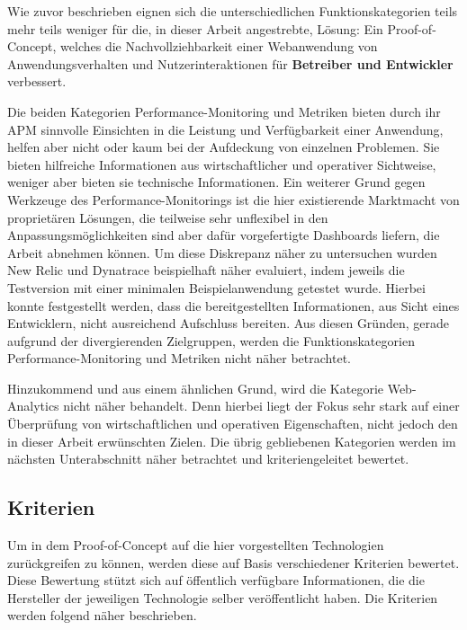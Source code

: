 Wie zuvor beschrieben eignen sich die unterschiedlichen Funktionskategorien teils mehr teils weniger für die, in dieser Arbeit angestrebte, Lösung: Ein Proof-of-Concept, welches die Nachvollziehbarkeit einer Webanwendung von Anwendungsverhalten und Nutzerinteraktionen für \textbf{Betreiber und Entwickler} verbessert.

Die beiden Kategorien Performance-Monitoring und Metriken bieten durch ihr APM sinnvolle Einsichten in die Leistung und Verfügbarkeit einer Anwendung, helfen aber nicht oder kaum bei der Aufdeckung von einzelnen Problemen. Sie bieten hilfreiche Informationen aus wirtschaftlicher und operativer Sichtweise, weniger aber bieten sie technische Informationen. Ein weiterer Grund gegen Werkzeuge des Performance-Monitorings ist die hier existierende Marktmacht von proprietären Lösungen, die teilweise sehr unflexibel in den Anpassungsmöglichkeiten sind aber dafür vorgefertigte Dashboards liefern, die Arbeit abnehmen können. Um diese Diskrepanz näher zu untersuchen wurden New Relic und Dynatrace beispielhaft näher evaluiert, indem jeweils die Testversion mit einer minimalen Beispielanwendung getestet wurde. Hierbei konnte festgestellt werden, dass die bereitgestellten Informationen, aus Sicht eines Entwicklern, nicht ausreichend Aufschluss bereiten. Aus diesen Gründen, gerade aufgrund der divergierenden Zielgruppen, werden die Funktionskategorien Performance-Monitoring und Metriken nicht näher betrachtet.

Hinzukommend und aus einem ähnlichen Grund, wird die Kategorie Web-Analytics nicht näher behandelt. Denn hierbei liegt der Fokus sehr stark auf einer Überprüfung von wirtschaftlichen und operativen Eigenschaften, nicht jedoch den in dieser Arbeit erwünschten Zielen. Die übrig gebliebenen Kategorien werden im nächsten Unterabschnitt näher betrachtet und kriteriengeleitet bewertet.

\subsection{Kriterien}

Um in dem Proof-of-Concept auf die hier vorgestellten Technologien zurückgreifen zu können, werden diese auf Basis verschiedener Kriterien bewertet. Diese Bewertung stützt sich auf öffentlich verfügbare Informationen, die die Hersteller der jeweiligen Technologie selber veröffentlicht haben. Die Kriterien werden folgend näher beschrieben.

